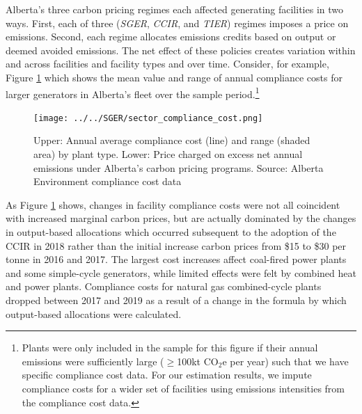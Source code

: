 \documentclass[12pt]{article}
\newcommand{\coe}{\text{CO$_2$e }}
\begin{document}
Alberta's three carbon pricing regimes each affected generating facilities in two ways. First, each of three (\emph{SGER}, \emph{CCIR}, and \emph{TIER}) regimes imposes a price on emissions. Second, each regime allocates emissions credits based on output or deemed avoided emissions. The net effect of these policies creates variation within and across facilities and facility types and over time.  Consider, for example, Figure \ref{fig:sector_compliance_cost} which shows the mean value and range of annual compliance costs for larger generators in Alberta's fleet over the sample period.\footnote{Plants were only included in the sample for this figure if their annual emissions were sufficiently large ($\geq$100kt CO$_2$e per year) such that we have specific compliance cost data. For our estimation results, we impute compliance costs for a wider set of facilities using emissions intensities from the compliance cost data.}

\begin{figure}[t]%
	\centering \vspace{-.25cm} \texttt{[image: ../../SGER/sector\_compliance\_cost.png]}
\vspace{-0.75cm}	\caption{Upper: Annual average compliance cost (line) and range (shaded area) by plant type. Lower: Price charged on excess net annual emissions under Alberta's carbon pricing programs. Source: Alberta Environment compliance cost data}
\label{fig:sector_compliance_cost}
\end{figure}

As Figure \ref{fig:sector_compliance_cost} shows, changes in facility compliance costs were not all coincident with increased marginal carbon prices, but are actually dominated by the changes in output-based allocations which occurred subsequent to the adoption of the CCIR in 2018 rather than the initial increase carbon prices from \$15 to \$30 per tonne \coe in 2016 and 2017. The largest cost increases affect coal-fired power plants and some simple-cycle generators, while limited effects were felt by combined heat and power plants. Compliance costs for natural gas combined-cycle plants dropped between 2017 and 2019 as a result of a change in the formula by which output-based allocations were calculated.
\end{document}
